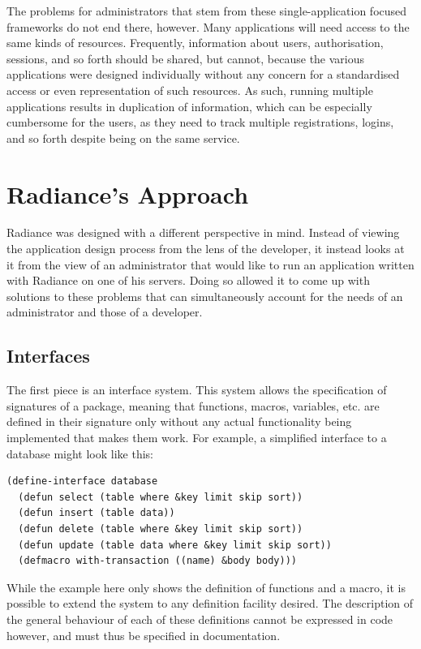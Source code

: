 \documentclass{sig-alternate-05-2015}
\begin{document}
The problems for administrators that stem from these single-application focused frameworks do not end there, however. Many applications will need access to the same kinds of resources. Frequently, information about users, authorisation, sessions, and so forth should be shared, but cannot, because the various applications were designed individually without any concern for a standardised access or even representation of such resources. As such, running multiple applications results in duplication of information, which can be especially cumbersome for the users, as they need to track multiple registrations, logins, and so forth despite being on the same service. \\

\section{Radiance's Approach}
Radiance was designed with a different perspective in mind. Instead of viewing the application design process from the lens of the developer, it instead looks at it from the view of an administrator that would like to run an application written with Radiance on one of his servers. Doing so allowed it to come up with solutions to these problems that can simultaneously account for the needs of an administrator and those of a developer. \\

\subsection{Interfaces}
The first piece is an interface system. This system allows the specification of signatures of a package, meaning that functions, macros, variables, etc. are defined in their signature only without any actual functionality being implemented that makes them work. For example, a simplified interface to a database might look like this:

\begin{verbatim}
(define-interface database
  (defun select (table where &key limit skip sort))
  (defun insert (table data))
  (defun delete (table where &key limit skip sort))
  (defun update (table data where &key limit skip sort))
  (defmacro with-transaction ((name) &body body)))
\end{verbatim}

While the example here only shows the definition of functions and a macro, it is possible to extend the system to any definition facility desired. The description of the general behaviour of each of these definitions cannot be expressed in code however, and must thus be specified in documentation. \\
\end{document}
